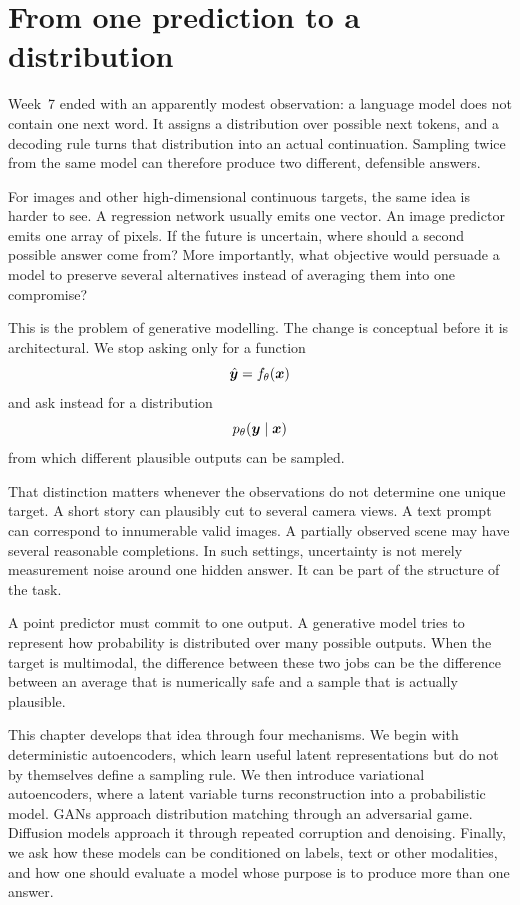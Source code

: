 \chapter{From one prediction to a distribution}
\label{chap:week08}

Week~7 ended with an apparently modest observation: a language model does not contain one next word. It assigns a distribution over possible next tokens, and a decoding rule turns that distribution into an actual continuation. Sampling twice from the same model can therefore produce two different, defensible answers.

For images and other high-dimensional continuous targets, the same idea is harder to see. A regression network usually emits one vector. An image predictor emits one array of pixels. If the future is uncertain, where should a second possible answer come from? More importantly, what objective would persuade a model to preserve several alternatives instead of averaging them into one compromise?

This is the problem of generative modelling. The change is conceptual before it is architectural. We stop asking only for a function
\[
  \hat{\bm{y}} = f_\theta(\bm{x})
\]
and ask instead for a distribution
\[
  p_\theta(\bm{y}\mid\bm{x})
\]
from which different plausible outputs can be sampled.

That distinction matters whenever the observations do not determine one unique target. A short story can plausibly cut to several camera views. A text prompt can correspond to innumerable valid images. A partially observed scene may have several reasonable completions. In such settings, uncertainty is not merely measurement noise around one hidden answer. It can be part of the structure of the task.

\begin{keyidea}
A point predictor must commit to one output. A generative model tries to represent how probability is distributed over many possible outputs. When the target is multimodal, the difference between these two jobs can be the difference between an average that is numerically safe and a sample that is actually plausible.
\end{keyidea}

This chapter develops that idea through four mechanisms. We begin with deterministic autoencoders, which learn useful latent representations but do not by themselves define a sampling rule. We then introduce variational autoencoders, where a latent variable turns reconstruction into a probabilistic model. GANs approach distribution matching through an adversarial game. Diffusion models approach it through repeated corruption and denoising. Finally, we ask how these models can be conditioned on labels, text or other modalities, and how one should evaluate a model whose purpose is to produce more than one answer.

